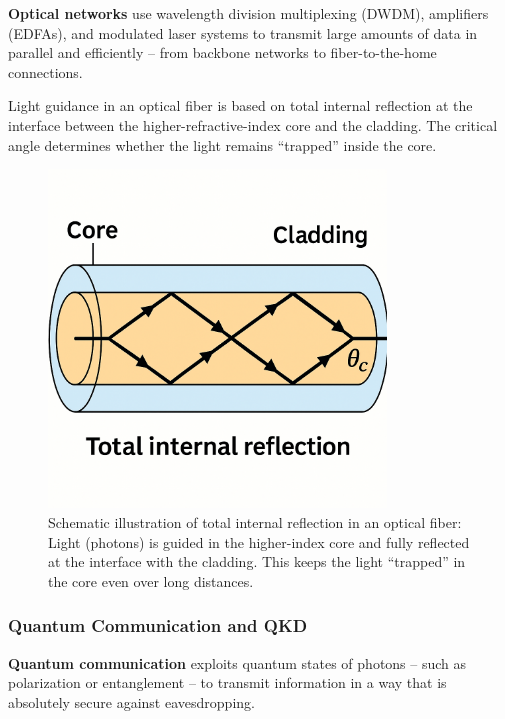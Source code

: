 \textbf{Optical networks} use wavelength division multiplexing (DWDM), amplifiers (EDFAs), and modulated laser systems to transmit large amounts of data in parallel and efficiently – from backbone networks to fiber-to-the-home connections.
\vspace{1em}
\begin{tcolorbox}[physikbox, title=Total Internal Reflection in Optical Fibers]
	\label{box:glasfaser}
	\small
	Light guidance in an optical fiber is based on total internal reflection at the interface between the higher-refractive-index core and the cladding. The critical angle determines whether the light remains “trapped” inside the core.
\end{tcolorbox}
\newpage
\noindent
\begin{figure}[H]
	\centering
	\includegraphics[width=0.8\textwidth]{bilder/glasfaser.png}
	\caption{Schematic illustration of total internal reflection in an optical fiber: Light (photons) is guided in the higher-index core and fully reflected at the interface with the cladding. This keeps the light “trapped” in the core even over long distances.}
	\label{fig:totalreflexion}
\end{figure}
\subsubsection{Quantum Communication and QKD}

\textbf{Quantum communication} exploits quantum states of photons – such as polarization or entanglement – to transmit information in a way that is absolutely secure against eavesdropping.

